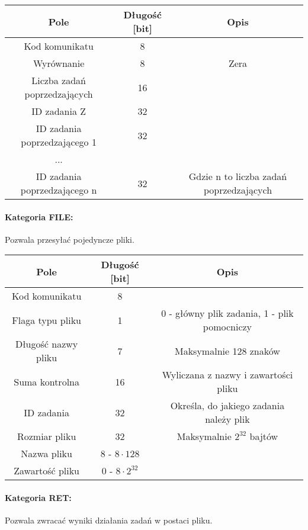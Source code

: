 \documentclass[10pt,a4paper]{article}
\begin{document}
            \begin{tabular}{ c | c | c }
			    \textbf{Pole} & \textbf{Długość [bit]} & \textbf{Opis} \\
			    \hline
			    Kod komunikatu & 8 & \\
			    Wyrównanie & 8 & Zera \\
			    Liczba zadań poprzedzających & 16 & \\
			    ID zadania Z & 32 & \\
			    ID zadania poprzedzającego 1 & 32 & \\
			    ... &  &  \\
			    ID zadania poprzedzającego n & 32 & Gdzie n to liczba zadań poprzedzających \\
			\end{tabular}
			
			\paragraph{Kategoria FILE:\\}
            Pozwala przesyłać pojedyncze pliki.
            
            \begin{tabular}{ c | c | c }
			    \textbf{Pole} & \textbf{Długość [bit]} & \textbf{Opis} \\
			    \hline
			    Kod komunikatu & 8 & \\
			    Flaga typu pliku & 1 & 0 - główny plik zadania, 1 - plik pomocniczy \\
			    Długość nazwy pliku & 7 & Maksymalnie 128 znaków \\
			    Suma kontrolna & 16 & Wyliczana z nazwy i zawartości pliku \\
			    ID zadania & 32 & Określa, do jakiego zadania należy plik \\
			    Rozmiar pliku & 32 & Maksymalnie $ 2^{32} $ bajtów \\
			    Nazwa pliku & 8 - $ 8 \cdot 128 $ &  \\
			    Zawartość pliku & 0 - $ 8 \cdot 2^{32} $ &  \\
			\end{tabular}
			
			\paragraph{Kategoria RET:\\}
            Pozwala zwracać wyniki działania zadań w postaci pliku.
            
\end{document}
